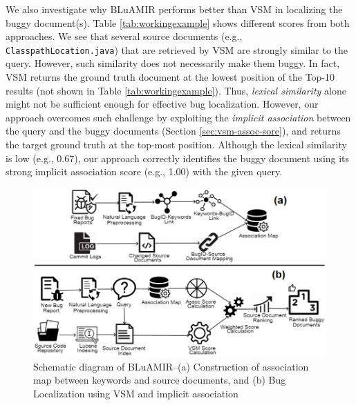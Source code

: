 \documentclass[sigconf,review,anonymous]{acmart}
\begin{document}
We also investigate why BLuAMIR performs better than VSM in localizing the buggy document(s). Table \ref{tab:workingexample} shows different scores from both approaches. We see that several source documents (e.g., \texttt{ClasspathLocation.java}) that are retrieved by VSM are  
strongly similar to the query. However, such similarity does not necessarily make them buggy. In fact, VSM returns the ground truth document at the lowest position of the Top-10 results (not shown in Table \ref{tab:workingexample}). Thus, \emph{lexical similarity} alone might not be sufficient enough for effective bug localization. However, our approach overcomes such challenge 
by exploiting the \emph{implicit association} between the query and the buggy documents (Section \ref{sec:vsm-assoc-sore}), and returns the target ground truth at the top-most position. Although the lexical similarity is low (e.g., 0.67), our approach correctly identifies the buggy document using its strong implicit association score (e.g., 1.00) with the given query.  

\begin{figure}
	\centering
	\includegraphics[width=4.8in]{SD6Trans}
	\vspace{-.2cm}
	\caption{Schematic diagram of BLuAMIR--(a) Construction of association map between keywords and source documents,  and (b) Bug Localization using VSM and implicit association}
	\label{fig:systemDiagram}
	\vspace{-.2cm}
\end{figure}
\end{document}
